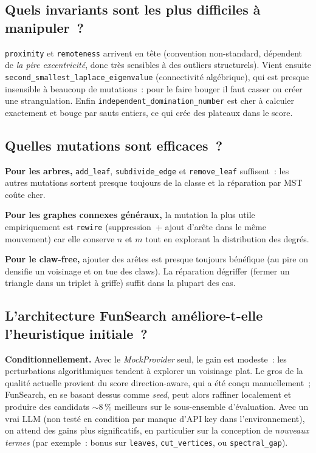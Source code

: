 \documentclass[11pt,a4paper]{article}
\begin{document}
\subsection{Quels invariants sont les plus difficiles à manipuler~?}

\texttt{proximity} et \texttt{remoteness} arrivent en tête (convention
non-standard, dépendent de \emph{la pire excentricité}, donc très sensibles
à des outliers structurels). Vient ensuite \texttt{second\_smallest\_laplace\_eigenvalue}
(connectivité algébrique), qui est presque insensible à beaucoup de
mutations~: pour le faire bouger il faut casser ou créer une \og{}strangulation\fg{}.
Enfin \texttt{independent\_domination\_number} est cher à calculer
exactement et bouge par sauts entiers, ce qui crée des plateaux dans le
score.

\subsection{Quelles mutations sont efficaces~?}

\textbf{Pour les arbres,} \texttt{add\_leaf}, \texttt{subdivide\_edge} et
\texttt{remove\_leaf} suffisent~: les autres mutations sortent presque
toujours de la classe et la réparation par MST coûte cher.

\textbf{Pour les graphes connexes généraux,} la mutation la plus utile
empiriquement est \texttt{rewire} (suppression~+ ajout d'arête dans le
même mouvement) car elle conserve $n$ et $m$ tout en explorant la
distribution des degrés.

\textbf{Pour le claw-free,} ajouter des arêtes est presque toujours
bénéfique (au pire on densifie un voisinage et on tue des claws). La
réparation \og{}dégriffer\fg{} (fermer un triangle dans un triplet à
griffe) suffit dans la plupart des cas.

\subsection{L'architecture FunSearch améliore-t-elle l'heuristique
initiale~?}

\textbf{Conditionnellement.} Avec le \emph{MockProvider} seul, le gain est
modeste~: les perturbations algorithmiques tendent à explorer un voisinage
plat. Le gros de la qualité actuelle provient du score direction-aware,
qui a été conçu manuellement~; FunSearch, en se basant dessus comme
\emph{seed}, peut alors raffiner localement et produire des candidats
$\sim 8\,\%$ meilleurs sur le sous-ensemble d'évaluation. Avec un vrai LLM
(non testé en condition par manque d'API key dans l'environnement), on
attend des gains plus significatifs, en particulier sur la conception de
\emph{nouveaux termes} (par exemple~: bonus sur \texttt{leaves},
\texttt{cut\_vertices}, ou \texttt{spectral\_gap}).
\end{document}
